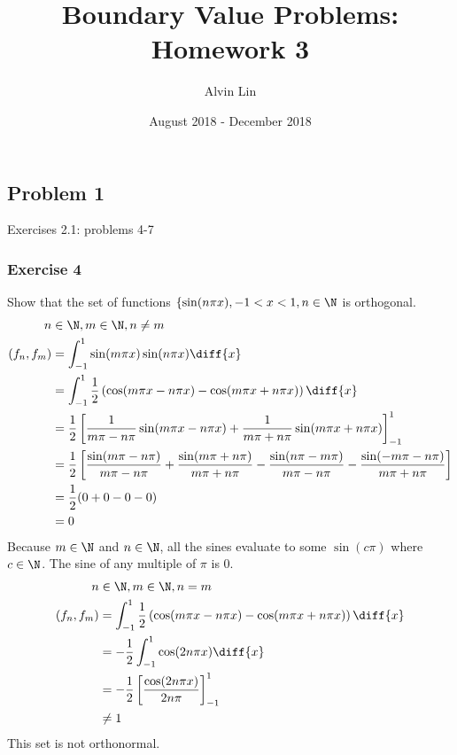 \documentclass{math}
\title{Boundary Value Problems: Homework 3}
\author{Alvin Lin}
\date{August 2018 - December 2018}
\begin{document}
\maketitle

\subsection*{Problem 1}
Exercises 2.1: problems 4-7

\subsubsection*{Exercise 4}
Show that the set of functions \( \{\sin(n\pi x), -1<x<1, n\in\N \) is
orthogonal.
\begin{align*}
  n&\in\N,m\in\N,n\ne m \\
  (f_n,f_m) &= \int_{-1}^{1}\sin(m\pi x)\sin(n\pi x)\diff{x} \\
  &= \int_{-1}^{1}\frac{1}{2}\left(\cos(m\pi x-n\pi x)-
    \cos(m\pi x+n\pi x)\right)\diff{x} \\
  &= \frac{1}{2}\left[\frac{1}{m\pi-n\pi}\sin(m\pi x-n\pi x)+
    \frac{1}{m\pi+n\pi}\sin(m\pi x+n\pi x)\right]_{-1}^{1} \\
  &= \frac{1}{2}\left[
    \frac{\sin(m\pi-n\pi)}{m\pi-n\pi}+\frac{\sin(m\pi+n\pi)}{m\pi+n\pi}-
    \frac{\sin(n\pi-m\pi)}{m\pi-n\pi}-\frac{\sin(-m\pi-n\pi)}{m\pi+n\pi}
    \right] \\
  &= \frac{1}{2}(0+0-0-0) \\
  &= 0
\end{align*}
Because \( m\in\N \) and \( n\in\N \), all the sines evaluate to some
\( \sin(c\pi) \) where \( c\in\N \). The sine of any multiple of \( \pi \) is
0.
\begin{align*}
  n&\in\N,m\in\N,n=m \\
  (f_n,f_m) &= \int_{-1}^{1}\frac{1}{2}\left(\cos(m\pi x-n\pi x)-
    \cos(m\pi x+n\pi x)\right)\diff{x} \\
  &= -\frac{1}{2}\int_{-1}^{1}\cos(2n\pi x)\diff{x} \\
  &= -\frac{1}{2}\left[\frac{\cos(2n\pi x)}{2n\pi}\right]_{-1}^{1} \\
  &\ne 1
\end{align*}
This set is not orthonormal.
\end{document}

